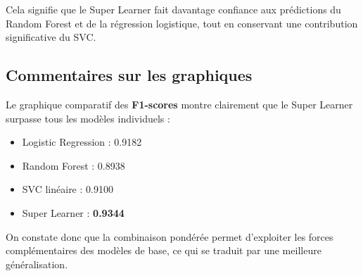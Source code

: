 Cela signifie que le Super Learner fait davantage confiance aux prédictions du Random Forest et de la régression logistique, tout en conservant une contribution significative du SVC.

\subsection*{Commentaires sur les graphiques}

Le graphique comparatif des \textbf{F1-scores} montre clairement que le Super Learner surpasse tous les modèles individuels :

\begin{itemize}
    \item Logistic Regression : 0.9182
    \item Random Forest : 0.8938
    \item SVC linéaire : 0.9100
    \item Super Learner : \textbf{0.9344}
\end{itemize}

On constate donc que la combinaison pondérée permet d'exploiter les forces complémentaires des modèles de base, ce qui se traduit par une meilleure généralisation.
